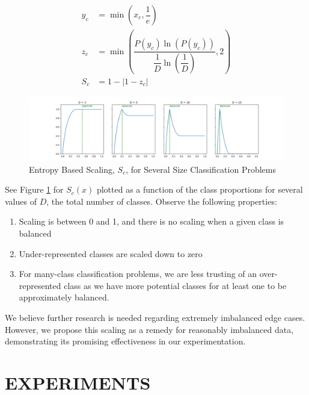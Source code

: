\documentclass{article} %
\begin{document}
\begin{align}
    y_c &= \min \left( x_c, \dfrac{1}{e} \right) \\
    z_c &= \min \left( \dfrac{P(y_c) \ln \left( P(y_c) \right)}{\dfrac{1}{D} \ln \left( \dfrac{1}{D} \right)}, 2 \right) \\
    S_c &= 1 - | 1 - z_c |    
\end{align}

\begin{figure}[h]
    \centering
    \includegraphics[scale=.34]{article/99_visuals/abs_scaling.png}
    \caption{Entropy Based Scaling, $S_c$, for Several Size Classification Problems}
    \label{fig:scaling}
\end{figure}

See Figure \ref{fig:scaling} for $S_c(x)$ plotted as a function of the class proportions for several values of $D$, the total number of classes. Observe the following  properties:
\begin{enumerate}
    \item Scaling is between 0 and 1, and there is no scaling when a given class is balanced
    \item Under-represented classes are scaled down to zero
    \item For many-class classification problems, we are less trusting of an over-represented class as we have more potential classes for at least one to be approximately balanced.
\end{enumerate}

We believe further research is needed regarding extremely imbalanced edge cases. However, we propose this scaling as a remedy for reasonably imbalanced data, demonstrating its promising effectiveness in our experimentation.

\section{EXPERIMENTS}

%
\end{document}
